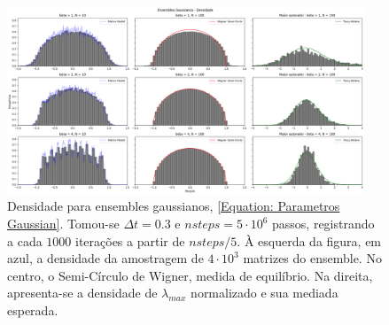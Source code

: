 \begin{figure}[ht!]
	\centering
	\includegraphics[width=0.95\textwidth]{Assets/validationGaussianTracy.png}
	\caption{Densidade para ensembles gaussianos, \ref{Equation: Parametros Gaussian}. Tomou-se $\Delta t = 0.3$ e $nsteps = 5\cdot10^6$ passos, registrando a cada $1000$ iterações a partir de $nsteps/5$. À esquerda da figura, em azul, a densidade da amostragem de $4\cdot10^3$ matrizes do ensemble. No centro, o Semi-Círculo de Wigner, medida de equilíbrio. Na direita, apresenta-se a densidade de $\lambda_{max}$ normalizado e sua mediada esperada.}
	\label{Figura: Gaussian}
\end{figure}

